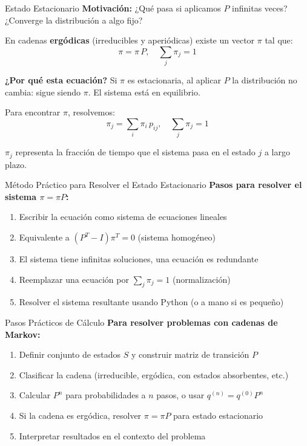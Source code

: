\documentclass{beamer}
\begin{document}
\begin{frame}{Estado Estacionario}
    \small
    \textbf{Motivación:} ¿Qué pasa si aplicamos $P$ infinitas veces? ¿Converge la distribución a algo fijo?

    \vspace{0.5em}

    En cadenas \textbf{ergódicas} (irreducibles y aperiódicas) existe un vector $\pi$ tal que:
    \[
    \pi = \pi\,P,\quad \sum_j \pi_j=1
    \]

    \textbf{¿Por qué esta ecuación?} Si $\pi$ es estacionaria, al aplicar $P$ la distribución no cambia: sigue siendo $\pi$. El sistema está en equilibrio.

    \vspace{0.3em}

    Para encontrar $\pi$, resolvemos:
    \[
    \pi_j = \sum_i \pi_i\,p_{ij},\quad \sum_j \pi_j=1
    \]

    $\pi_j$ representa la fracción de tiempo que el sistema pasa en el estado $j$ a largo plazo.
\end{frame}

\begin{frame}{Método Práctico para Resolver el Estado Estacionario}
    \small
    \textbf{Pasos para resolver el sistema $\pi = \pi P$:}

    \begin{enumerate}
        \item Escribir la ecuación como sistema de ecuaciones lineales
        \item Equivalente a $(P^T - I)\pi^T = 0$ (sistema homogéneo)
        \item El sistema tiene infinitas soluciones, una ecuación es redundante
        \item Reemplazar una ecuación por $\sum_j \pi_j = 1$ (normalización)
        \item Resolver el sistema resultante usando Python (o a mano si es pequeño)
    \end{enumerate}
\end{frame}

\begin{frame}{Pasos Prácticos de Cálculo}
    \textbf{Para resolver problemas con cadenas de Markov:}

    \begin{enumerate}
        \item Definir conjunto de estados $S$ y construir matriz de transición $P$
        \item Clasificar la cadena (irreducible, ergódica, con estados absorbentes, etc.)
        \item Calcular $P^n$ para probabilidades a $n$ pasos, o usar $q^{(n)}=q^{(0)}P^n$
        \item Si la cadena es ergódica, resolver $\pi=\pi P$ para estado estacionario
        \item Interpretar resultados en el contexto del problema
    \end{enumerate}
\end{frame}
\end{document}
